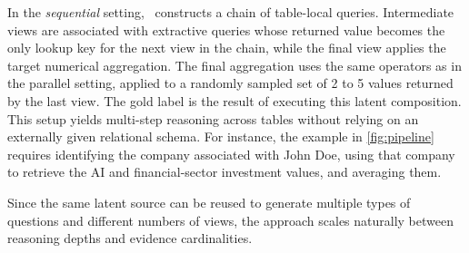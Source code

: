 In the \emph{sequential} setting, \name\ constructs a chain of table-local queries. Intermediate views are associated with extractive queries whose returned value becomes the only lookup key for the next view in the chain, while the final view applies the target numerical aggregation. The final aggregation uses the same operators as in the parallel setting, applied to a randomly sampled set of 2 to 5 values returned by the last view. The gold label is the result of executing this latent composition. This setup yields multi-step reasoning across tables without relying on an externally given relational schema. For instance, the example in \autoref{fig:pipeline} requires identifying the company associated with John Doe, using that company to retrieve the AI and financial-sector investment values, and averaging them.

Since the same latent source can be reused to generate multiple types of questions and different numbers of views, the approach scales naturally between reasoning depths and evidence cardinalities.

